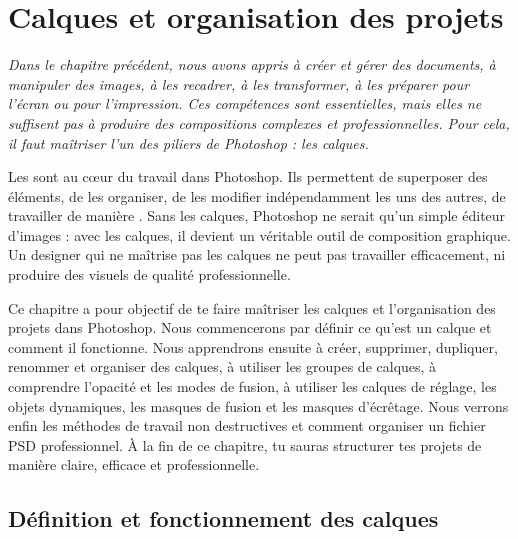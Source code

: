 
\chapter{Calques et organisation des projets}

\noindent
\textit{Dans le chapitre précédent, nous avons appris à créer et gérer des documents, à manipuler des images, à les recadrer, à les transformer, à les préparer pour l'écran ou pour l'impression. Ces compétences sont essentielles, mais elles ne suffisent pas à produire des compositions complexes et professionnelles. Pour cela, il faut maîtriser l'un des piliers de Photoshop : les calques.}

\vspace{1em}

\noindent
Les  sont au cœur du travail dans Photoshop. Ils permettent de superposer des éléments, de les organiser, de les modifier indépendamment les uns des autres, de travailler de manière . Sans les calques, Photoshop ne serait qu'un simple éditeur d'images : avec les calques, il devient un véritable outil de composition graphique. Un designer qui ne maîtrise pas les calques ne peut pas travailler efficacement, ni produire des visuels de qualité professionnelle.

\vspace{1em}

\noindent
Ce chapitre a pour objectif de te faire maîtriser les calques et l'organisation des projets dans Photoshop. Nous commencerons par définir ce qu'est un calque et comment il fonctionne. Nous apprendrons ensuite à créer, supprimer, dupliquer, renommer et organiser des calques, à utiliser les groupes de calques, à comprendre l'opacité et les modes de fusion, à utiliser les calques de réglage, les objets dynamiques, les masques de fusion et les masques d'écrêtage. Nous verrons enfin les méthodes de travail non destructives et comment organiser un fichier PSD professionnel. À la fin de ce chapitre, tu sauras structurer tes projets de manière claire, efficace et professionnelle.

\section{Définition et fonctionnement des calques}


